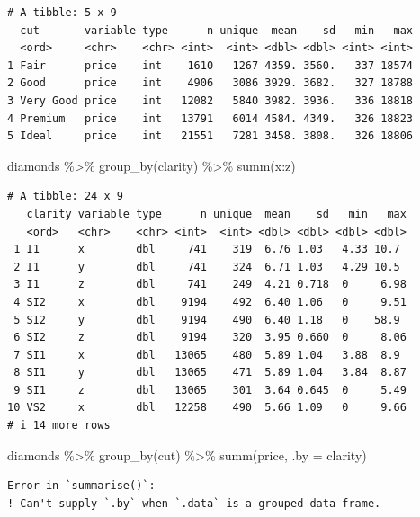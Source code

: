 \documentclass[
  letterpaper,
]{ctexbook}
\newenvironment{Shaded}{\begin{snugshade}}{\end{snugshade}}
\newcommand{\AttributeTok}[1]{\textcolor[rgb]{0.40,0.45,0.13}{#1}}
\newcommand{\FunctionTok}[1]{\textcolor[rgb]{0.28,0.35,0.67}{#1}}
\newcommand{\NormalTok}[1]{\textcolor[rgb]{0.00,0.23,0.31}{#1}}
\newcommand{\SpecialCharTok}[1]{\textcolor[rgb]{0.37,0.37,0.37}{#1}}
\begin{document}
\begin{verbatim}
# A tibble: 5 x 9
  cut       variable type      n unique  mean    sd   min   max
  <ord>     <chr>    <chr> <int>  <int> <dbl> <dbl> <int> <int>
1 Fair      price    int    1610   1267 4359. 3560.   337 18574
2 Good      price    int    4906   3086 3929. 3682.   327 18788
3 Very Good price    int   12082   5840 3982. 3936.   336 18818
4 Premium   price    int   13791   6014 4584. 4349.   326 18823
5 Ideal     price    int   21551   7281 3458. 3808.   326 18806
\end{verbatim}

\begin{Shaded}
\begin{Highlighting}[]
\NormalTok{diamonds }\SpecialCharTok{\%\textgreater{}\%}
  \FunctionTok{group\_by}\NormalTok{(clarity) }\SpecialCharTok{\%\textgreater{}\%}
  \FunctionTok{summ}\NormalTok{(x}\SpecialCharTok{:}\NormalTok{z)}
\end{Highlighting}
\end{Shaded}

\begin{verbatim}
# A tibble: 24 x 9
   clarity variable type      n unique  mean    sd   min   max
   <ord>   <chr>    <chr> <int>  <int> <dbl> <dbl> <dbl> <dbl>
 1 I1      x        dbl     741    319  6.76 1.03   4.33 10.7 
 2 I1      y        dbl     741    324  6.71 1.03   4.29 10.5 
 3 I1      z        dbl     741    249  4.21 0.718  0     6.98
 4 SI2     x        dbl    9194    492  6.40 1.06   0     9.51
 5 SI2     y        dbl    9194    490  6.40 1.18   0    58.9 
 6 SI2     z        dbl    9194    320  3.95 0.660  0     8.06
 7 SI1     x        dbl   13065    480  5.89 1.04   3.88  8.9 
 8 SI1     y        dbl   13065    471  5.89 1.04   3.84  8.87
 9 SI1     z        dbl   13065    301  3.64 0.645  0     5.49
10 VS2     x        dbl   12258    490  5.66 1.09   0     9.66
# i 14 more rows
\end{verbatim}

\begin{Shaded}
\begin{Highlighting}[]
\NormalTok{diamonds }\SpecialCharTok{\%\textgreater{}\%}
  \FunctionTok{group\_by}\NormalTok{(cut) }\SpecialCharTok{\%\textgreater{}\%}
  \FunctionTok{summ}\NormalTok{(price, }\AttributeTok{.by =}\NormalTok{ clarity)}
\end{Highlighting}
\end{Shaded}

\begin{verbatim}
Error in `summarise()`:
! Can't supply `.by` when `.data` is a grouped data frame.
\end{verbatim}
\end{document}
